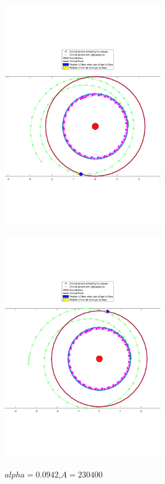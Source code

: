 \documentclass[../Paper.tex]{subfiles}
\begin{document}
\begin{figure}[H]
 \begin{minipage}[t]{0.5\linewidth}
 \centering{}
 \includegraphics[width=7cm]{../Figures/orbit6.pdf}
 \label{fig:orbit6}
\caption{$alpha=0.0658$,$A=230400$}
 \end{minipage}
 \begin{minipage}[t]{0.5\linewidth}
 \centering{}
 \includegraphics[width=7cm]{../Figures/orbit7.pdf}
 \label{fig:orbit7}
\caption{$alpha=0.0942$,$A=230400$}
 \end{minipage}
\end{figure}
\end{document}
